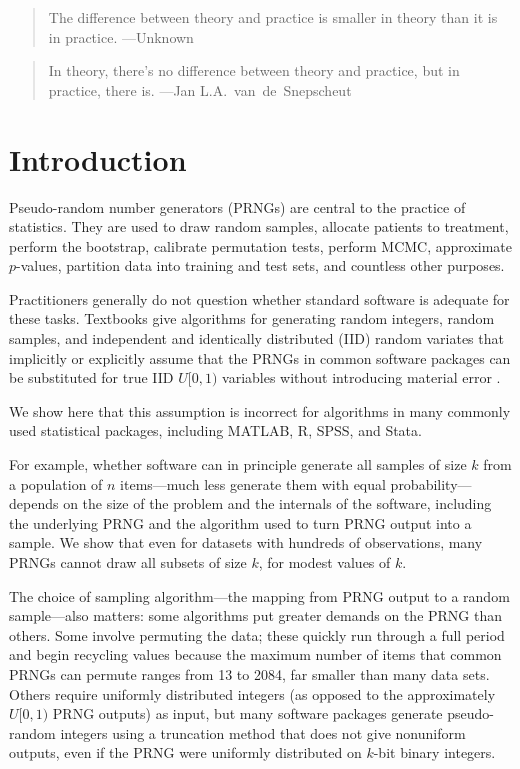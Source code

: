 \documentclass[graybox]{svmult}
\begin{document}
\begin{quotation}
The difference between theory and practice is smaller in theory than it is in practice. ---Unknown
\end{quotation}


\begin{quotation}
In theory, there's no difference between theory and practice, but in practice, there is. ---Jan L.A.~van~de~Snepscheut
\end{quotation}

\section{Introduction}
\label{sec:introduction}


Pseudo-random number generators (PRNGs) are central to the practice of statistics.
They are used to draw random samples, allocate patients to treatment, perform the bootstrap, 
calibrate permutation tests, perform MCMC, approximate $p$-values, partition data into training and test sets, and countless other purposes.

Practitioners generally do not question whether standard software is adequate for these tasks.
Textbooks give algorithms for generating random integers, random samples,
and independent and identically distributed (IID) random variates 
that implicitly or explicitly assume that the PRNGs in common software packages 
can be substituted for true IID $U[0,1)$ variables without introducing material error 
\cite{stine_statistics_2014, leblanc_statistics_2004, dahlberg_practical_2010, press_numerical_1988, peck_introduction_2011}.

We show here that this assumption is incorrect for algorithms in many commonly used statistical packages,
including MATLAB, R, SPSS, and Stata.

For example, whether software can in principle generate all samples of size $k$ from a population of
$n$ items---much less generate them with equal probability---depends on the size of the problem and the internals of the software, including the underlying PRNG and the
algorithm used to turn PRNG output into a sample.
We show that even for datasets with hundreds of observations, 
many PRNGs cannot draw all subsets of size $k$, for modest values of $k$.

The choice of sampling algorithm---the mapping from PRNG output to a random sample---also matters:
some algorithms put greater demands on the PRNG than others.
Some involve permuting the data; these quickly run through a full period and begin recycling values
because the maximum number of items that common PRNGs can permute ranges from 13 to 2084, far smaller than many data sets.
Others require uniformly distributed integers (as opposed to the approximately $U[0,1)$ PRNG outputs) as input, but many software packages generate
pseudo-random integers using a truncation method that does not give nonuniform outputs, even
if the PRNG were uniformly distributed on $k$-bit binary integers.
\end{document}
